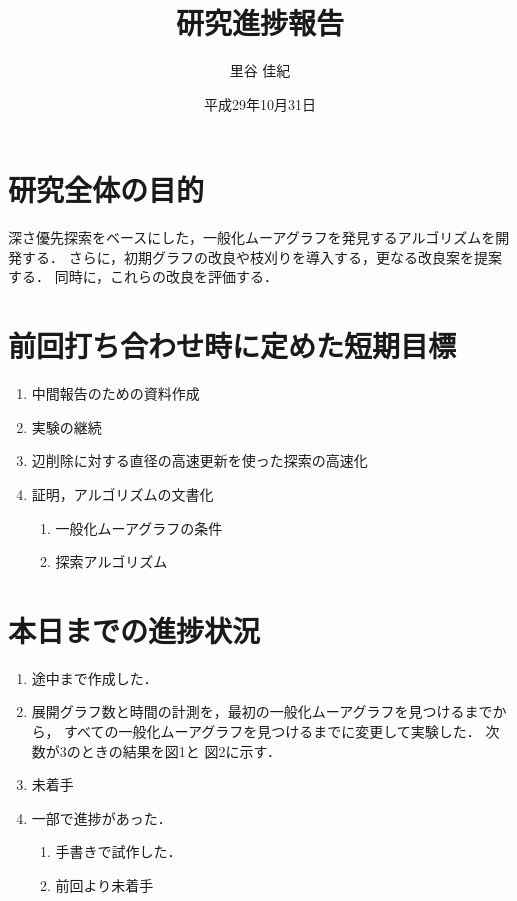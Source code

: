 \documentclass[xelatex,ja=standard,11pt]{bxjsarticle}
\title{研究進捗報告}
\author{里谷 佳紀}
\date{平成29年10月31日}
\providecommand{\tightlist}{%
  \setlength{\itemsep}{0pt}\setlength{\parskip}{0pt}}
\begin{document}
\maketitle

\section{研究全体の目的}

深さ優先探索をベースにした，一般化ムーアグラフを発見するアルゴリズムを開発する．
さらに，初期グラフの改良や枝刈りを導入する，更なる改良案を提案する．
同時に，これらの改良を評価する．

\section{前回打ち合わせ時に定めた短期目標}

\begin{enumerate}
\def\labelenumi{\arabic{enumi}.}
\tightlist
\item
  中間報告のための資料作成
\item
  実験の継続
\item
  辺削除に対する直径の高速更新を使った探索の高速化
\item
  証明，アルゴリズムの文書化

  \begin{enumerate}
  \def\labelenumii{\alph{enumii}.}
  \tightlist
  \item
    一般化ムーアグラフの条件
  \item
    探索アルゴリズム
  \end{enumerate}
\end{enumerate}

\section{本日までの進捗状況}

\begin{enumerate}
\def\labelenumi{\arabic{enumi}.}
\tightlist
\item
  途中まで作成した．
\item
  展開グラフ数と時間の計測を，最初の一般化ムーアグラフを見つけるまでから，
  すべての一般化ムーアグラフを見つけるまでに変更して実験した．
  次数が3のときの結果を図1と 図2に示す．
\item
  未着手
\item
  一部で進捗があった．

  \begin{enumerate}
  \def\labelenumii{\alph{enumii}.}
  \tightlist
  \item
    手書きで試作した．
  \item
    前回より未着手
  \end{enumerate}
\end{enumerate}
\end{document}
